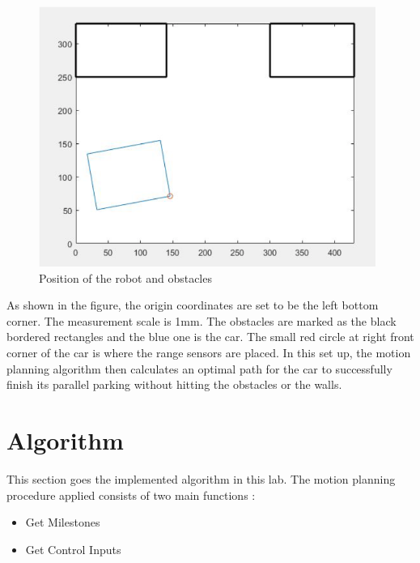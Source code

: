 \documentclass[12pt, letterpaper]{amsart} %
\numberwithin{equation}{section}
\begin{document}
\begin{figure}[h!]
\includegraphics[width=110mm]{fig_4.png}
\caption{Position of the robot and obstacles}
\label{fig:figure4}
\end{figure}

As shown in the figure, the origin coordinates are set to be the left bottom corner. The measurement scale is 1mm. The obstacles are marked as the black bordered rectangles and the blue one is the car. The small red circle at right front corner of the car is where the range sensors are placed.  
In this set up, the motion planning algorithm then calculates an optimal path for the car to 
successfully finish its parallel parking
without hitting the obstacles or the walls.

\newpage 
\section{Algorithm}
This section goes the implemented algorithm in this lab. The motion planning procedure applied consists of two main functions : 
\begin{itemize}
	\item Get Milestones
	\item Get Control Inputs 
\end{itemize}
\end{document}
